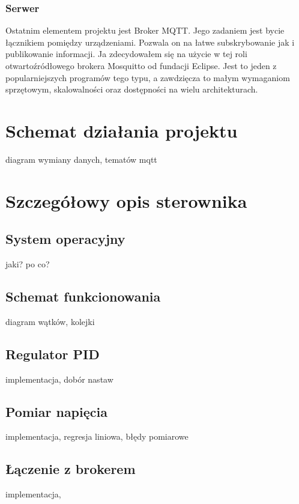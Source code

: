 \documentclass[eng, 11pt]{mgr}
\begin{document}
      \subsection{Serwer}
        Ostatnim elementem projektu jest Broker MQTT. Jego zadaniem jest
        bycie łącznikiem pomiędzy urządzeniami. Pozwala on na łatwe
        subskrybowanie jak i publikowanie informacji. Ja zdecydowałem się 
        na użycie w tej roli otwartoźródłowego brokera Mosquitto od fundacji 
        Eclipse. Jest to jeden z popularniejszych programów tego typu, a
        zawdzięcza to małym wymaganiom sprzętowym, skalowalności oraz
        dostępności na wielu architekturach. 
        

  \chapter{Schemat działania projektu}
        diagram wymiany danych, tematów mqtt 

  \chapter{Szczegółowy opis sterownika}
    \section{System operacyjny}
      jaki? po co? 
        
    \section{Schemat funkcionowania}
      diagram wątków, kolejki

    \section{Regulator PID}
      implementacja, dobór nastaw

    \section{Pomiar napięcia}
      implementacja, regresja liniowa, błędy pomiarowe

    \section{Łączenie z brokerem}
      implementacja, 
\end{document}
